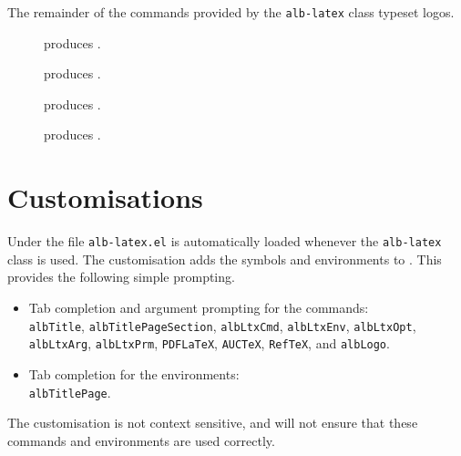 \documentclass[11pt,a4paper,oneside,titlepage]{alb-latex}
\begin{document}
The remainder of the commands provided by the \texttt{alb-latex} class
typeset logos.

\begin{description}
\item[] produces \PDFLaTeX{}.

\item[] produces \AUCTeX{}.

\item[] produces \RefTeX{}.

\item[] produces \albLogo{}.
\end{description}




\section{\AUCTeX{} Customisations}
\label{sec:alb-latex:auctex-cust}

Under \AUCTeX{} the file \texttt{alb-latex.el} is automatically loaded
whenever the \texttt{alb-latex} class is used.  The customisation adds
the symbols and environments to \AUCTeX{}.  This provides the following
simple prompting.
\begin{itemize}
\item
  \begin{flushleft}
    Tab completion and argument prompting for the commands:\\
    \texttt{albTitle}, \texttt{albTitlePageSection}, \texttt{albLtxCmd},
    \texttt{albLtxEnv}, \texttt{albLtxOpt}, \texttt{albLtxArg},
    \texttt{albLtxPrm}, \texttt{PDFLaTeX}, \texttt{AUCTeX},
    \texttt{RefTeX}, and \texttt{albLogo}.
  \end{flushleft}

\item
  \begin{flushleft}
    Tab completion for the environments:\\
    \texttt{albTitlePage}.
  \end{flushleft}
\end{itemize}
The customisation is not context sensitive, and will not ensure that
these commands and environments are used correctly.
\end{document}
